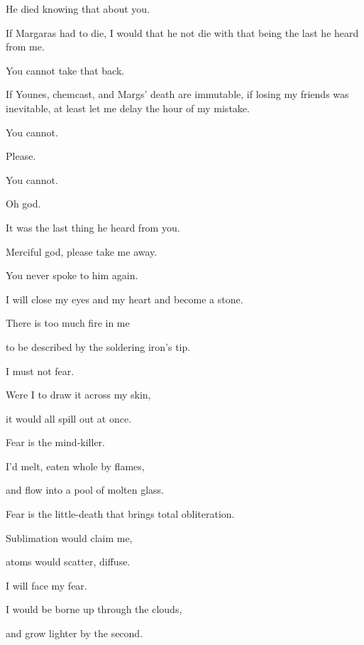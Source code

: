 \begin{ally}
He died knowing that about you.
\end{ally}
If Margaras had to die, I would that he not die with that being the last he heard from me.

\begin{ally}
You cannot take that back.
\end{ally}
If Younes, chemcast, and Margs' death are immutable, if losing my friends was inevitable, at least let me delay the hour of my mistake.

\begin{ally}
You cannot.
\end{ally}
Please.

\begin{ally}
You cannot.
\end{ally}
Oh god.

\begin{ally}
It was the last thing he heard from you.
\end{ally}
Merciful god, please take me away.

\begin{ally}
You never spoke to him again.
\end{ally}
I will close my eyes and my heart and become a stone.
\newpage

\noindent There is too much fire in me

to be described by the soldering iron's tip.

\begin{ally}
I must not fear.
\end{ally}
Were I to draw it across my skin,

it would all spill out at once.

\begin{ally}
Fear is the mind-killer.
\end{ally}
I'd melt, eaten whole by flames,

and flow into a pool of molten glass.

\begin{ally}
Fear is the little-death that brings total obliteration.
\end{ally}
Sublimation would claim me,

atoms would scatter, diffuse.

\begin{ally}
I will face my fear.
\end{ally}
I would be borne up through the clouds,

and grow lighter by the second.

